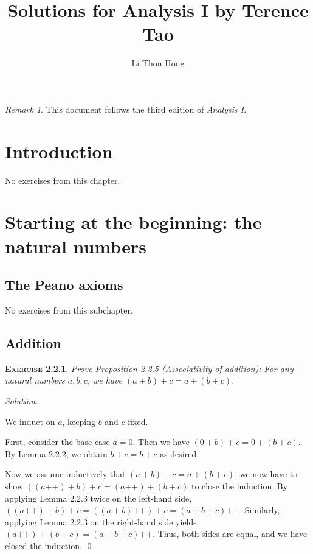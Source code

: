 \documentclass[12pt]{article}
\title{Solutions for Analysis I by Terence Tao}
\author{Li Thon Hong}
\date{}
\newcommand{\succr}[1]{#1 \textrm{++}}
\theoremstyle{remark}
\newtheorem*{remark}{Remark}
\newenvironment{exer}[2]{
    \noindent \setlength{\parskip}{1em}%
    \textsc{\textbf{Exercise #1}}. \textit{#2} \par
    \noindent \textit{Solution.} %
}{\bigskip}
\begin{document}
\maketitle
\tableofcontents
\vspace{5mm}
\begin{remark}
    This document follows the third edition of \textit{Analysis I}.
\end{remark}

\pagebreak


\section{Introduction}
No exercises from this chapter.

\pagebreak


\section{Starting at the beginning: the natural numbers}
\subsection{The Peano axioms}
No exercises from this subchapter.


\subsection{Addition}
\begin{exer}{2.2.1}{
    Prove Proposition 2.2.5 (Associativity of addition):
    For any natural numbers $a, b, c$, we have $(a + b) + c = a + (b + c)$.
}
    We induct on $a$, keeping $b$ and $c$ fixed.
    
    First, consider the base case $a = 0$.
    Then we have $(0 + b) + c = 0 + (b + c)$. By Lemma 2.2.2, we obtain $b + c = b + c$ as desired.
    \par
    Now we assume inductively that $(a + b) + c = a + (b + c)$;
    we now have to show $((\succr{a}) + b) + c = (\succr{a}) + (b+c)$ to close the induction.
    By applying Lemma 2.2.3 twice on the left-hand side, $((\succr{a}) + b) + c = (\succr{(a+b)}) + c = \succr{(a + b + c)}$.
    Similarly, applying Lemma 2.2.3 on the right-hand side yields $(\succr{a}) + (b+c) = \succr{(a + b + c)}$.
    Thus, both sides are equal, and we have closed the induction. \qed
\end{exer}
\end{document}
